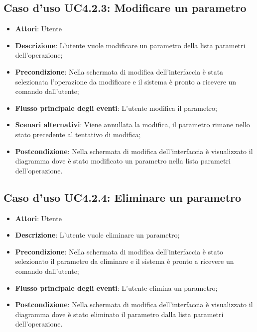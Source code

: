 \documentclass[../AnalisiDeiRequisiti.tex]{subfiles}
\begin{document}
			\subsection{Caso d'uso UC4.2.3: Modificare un parametro}
			\begin{itemize}
				\item \textbf{Attori}: Utente
				\item \textbf{Descrizione}: L'utente vuole modificare un parametro della lista parametri dell'operazione;
				\item \textbf{Precondizione}: Nella schermata di modifica dell'interfaccia è stata selezionata l'operazione da modificare e il sistema è pronto a ricevere un comando dall'utente;
				\item \textbf{Flusso principale degli eventi}: L'utente modifica il parametro;
				\item \textbf{Scenari alternativi}: Viene annullata la modifica, il parametro rimane nello stato precedente al tentativo di modifica;
				\item \textbf{Postcondizione}: Nella schermata di modifica dell'interfaccia è visualizzato il diagramma dove è stato modificato un parametro nella lista parametri dell'operazione.
			\end{itemize}
			\subsection{Caso d'uso UC4.2.4: Eliminare un parametro}
			\begin{itemize}
				\item \textbf{Attori}: Utente
				\item \textbf{Descrizione}: L'utente vuole eliminare un parametro;
				\item \textbf{Precondizione}: Nella schermata di modifica dell'interfaccia è stato selezionato il parametro da eliminare e il sistema è pronto a ricevere un comando dall'utente;
				\item \textbf{Flusso principale degli eventi}: L'utente elimina un parametro;
				\item \textbf{Postcondizione}: Nella schermata di modifica dell'interfaccia è visualizzato il diagramma dove è stato eliminato il parametro dalla lista parametri dell'operazione.	
			\end{itemize}
\end{document}
